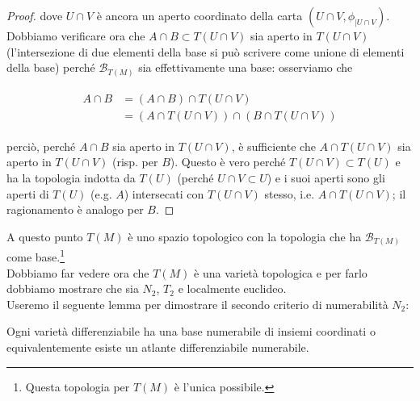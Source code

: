 \begin{proof}
	dove $ U \cap V $ è ancora un aperto coordinato della carta $ (U \cap V,\phi_{|U \cap V}) $. Dobbiamo verificare ora che $ A \cap B \subset T(U \cap V) $ sia aperto in $ T(U \cap V) $ (l'intersezione di due elementi della base si può scrivere come unione di elementi della base) perché $ \mathcal{B}_{T(M)} $ sia effettivamente una base: osserviamo che
	
	\begin{align}
		\begin{split}
			A \cap B &= (A \cap B) \cap T(U \cap V)\\
			&= (A \cap T(U \cap V)) \cap (B \cap T(U \cap V))
		\end{split}
	\end{align}

	perciò, perché $ A \cap B $ sia aperto in $ T(U \cap V) $, è sufficiente che $ A \cap T(U \cap V) $ sia aperto in $ T(U \cap V) $ (risp. per $ B $). Questo è vero perché $ T(U \cap V) \subset T(U) $ e ha la topologia indotta da $ T(U) $ (perché $ U \cap V \subset U $) e i suoi aperti sono gli aperti di $ T(U) $ (e.g. $ A $) intersecati con $ T(U \cap V) $ stesso, i.e. $ A \cap T(U \cap V) $; il ragionamento è analogo per $ B $.
\end{proof}

A questo punto $ T(M) $ è uno spazio topologico con la topologia che ha $ \mathcal{B}_{T(M)} $ come base.\footnote{%
	Questa topologia per $ T(M) $ è l'unica possibile.%
}\\
Dobbiamo far vedere ora che $ T(M) $ è una varietà topologica e per farlo dobbiamo mostrare che sia $ N_{2} $, $ T_{2} $ e localmente euclideo.\\
Useremo il seguente lemma per dimostrare il secondo criterio di numerabilità $ N_{2} $:

\begin{lemma}
	Ogni varietà differenziabile ha una base numerabile di insiemi coordinati o equivalentemente esiste un atlante differenziabile numerabile.
\end{lemma}

